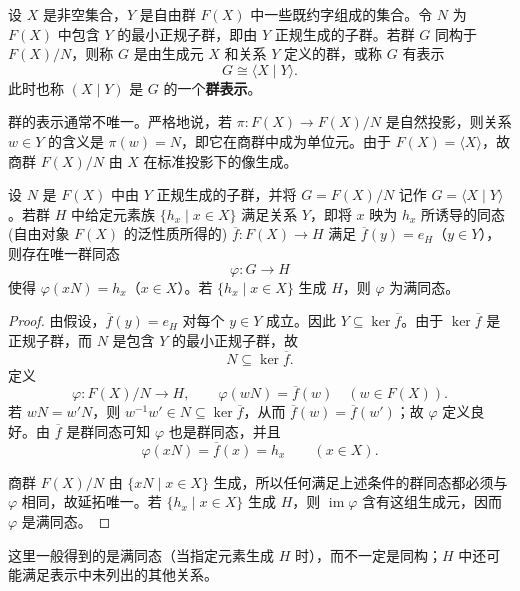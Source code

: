 \begin{definition}[群的表示]\label{def:group-presentation}
设 $X$ 是非空集合，$Y$ 是自由群 $F(X)$ 中一些既约字组成的集合。令 $N$ 为 $F(X)$ 中包含 $Y$ 的最小正规子群，即由 $Y$ 正规生成的子群。若群 $G$ 同构于 $F(X)/N$，则称 $G$ 是由生成元 $X$ 和关系 $Y$ 定义的群，或称 $G$ 有表示
\[
  G\cong\langle X\mid Y\rangle.
\]
此时也称 $(X\mid Y)$ 是 $G$ 的一个\textbf{群表示}。
\end{definition}

\begin{purplenote}
群的表示通常不唯一。严格地说，若 $\pi:F(X)\to F(X)/N$ 是自然投影，则关系 $w\in Y$ 的含义是 $\pi(w)=N$，即它在商群中成为单位元。由于 $F(X)=\langle X\rangle$，故商群 $F(X)/N$ 由 $X$ 在标准投影下的像生成。
\end{purplenote}

\begin{theorem}[范·戴克定理]\label{thm:van-dyck}
设 $N$ 是 $F(X)$ 中由 $Y$ 正规生成的子群，并将 $G=F(X)/N$ 记作 $G=\langle X\mid Y\rangle$。若群 $H$ 中给定元素族 $\{h_x\mid x\in X\}$ 满足关系 $Y$，即将 $x$ 映为 $h_x$ 所诱导的同态(自由对象 $F(X)$ 的泛性质所得的) $\overline f:F(X)\to H$ 满足 $\overline f(y)=e_H$（$y\in Y$），则存在唯一群同态
\[
  \varphi:G\longrightarrow H
\]
使得 $\varphi(xN)=h_x$（$x\in X$）。若 $\{h_x\mid x\in X\}$ 生成 $H$，则 $\varphi$ 为满同态。
\end{theorem}

\begin{proof}
由假设，$\overline f(y)=e_H$ 对每个 $y\in Y$ 成立。因此 $Y\subseteq\ker\overline f$。由于 $\ker\overline f$ 是正规子群，而 $N$ 是包含 $Y$ 的最小正规子群，故
\[
  N\subseteq\ker\overline f.
\]
定义
\[
  \varphi:F(X)/N\longrightarrow H,\qquad
  \varphi(wN)=\overline f(w)\quad(w\in F(X)).
\]
若 $wN=w'N$，则 $w^{-1}w'\in N\subseteq\ker\overline f$，从而 $\overline f(w)=\overline f(w')$；故 $\varphi$ 定义良好。由 $\overline f$ 是群同态可知 $\varphi$ 也是群同态，并且
\[
  \varphi(xN)=\overline f(x)=h_x\qquad(x\in X).
\]

商群 $F(X)/N$ 由 $\{xN\mid x\in X\}$ 生成，所以任何满足上述条件的群同态都必须与 $\varphi$ 相同，故延拓唯一。若 $\{h_x\mid x\in X\}$ 生成 $H$，则 $\operatorname{im}\varphi$ 含有这组生成元，因而 $\varphi$ 是满同态。
\end{proof}

\begin{purplenote}
这里一般得到的是满同态（当指定元素生成 $H$ 时），而不一定是同构；$H$ 中还可能满足表示中未列出的其他关系。
\end{purplenote}


